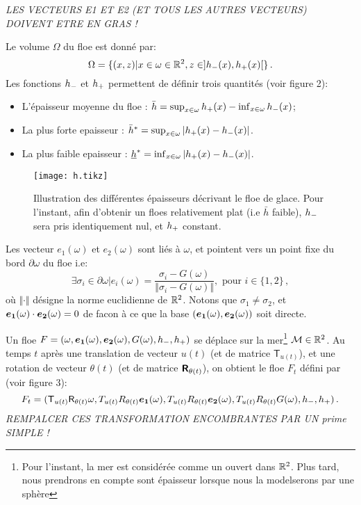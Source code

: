 \emph{LES VECTEURS E1 ET E2 (ET TOUS LES AUTRES VECTEURS) DOIVENT ETRE EN GRAS !}

Le volume $\Omega$ du floe est donné par:
\[
    \Omega = \{(x,z) | x \in \omega \in \mathbb{R}^2, z \in ]h_{-}(x), h_{+}(x)[ \} \,.
\] 
Les fonctions $h_{-}$ et $h_{+}$ permettent de définir trois quantités (voir figure 2):
\begin{itemize}
    \item L'épaisseur moyenne du floe : $\bar{h} =  \sup_{x\in\omega}{h_{+}(x)} - \inf_{x\in\omega}{h_{-}(x)}$;
    \item La plus forte epaisseur : $\bar{h}^* = \sup_{x\in\omega}{ \vert h_{+}(x) - h_{-}(x) \vert}$. 
    \item La plus faible epaisseur : $\underline{h}^* = \inf_{x\in\omega}{ \vert h_{+}(x) - h_{-}(x) \vert} $. 
\end{itemize}

\begin{figure}
    \centering
    \texttt{[image: h.tikz]}
    \caption{Illustration des différentes épaisseurs décrivant le floe de glace. Pour l'instant, afin d'obtenir un floes relativement plat (i.e $\bar{h}$ faible), $h_{-}$ sera pris identiquement nul, et $h_{+}$ constant.}
\end{figure}

Les vecteur $e_1(\omega)$ et $e_2(\omega)$ sont liés à $\omega$, et pointent vers un point fixe du bord $\partial \omega$ du floe i.e:
\[
    \exists \sigma_i \in \partial \omega | e_i(\omega) = \frac{\sigma_i - G(\omega)}{\Vert \sigma_i - G(\omega) \Vert}, \text{ pour } i \in \{1,2\} \,,
\]
où $\Vert \cdot \Vert$ désigne la norme euclidienne de $\mathbb{R}^2$. Notons que $\sigma_1 \neq \sigma_2$, et $\bm{e_1}(\omega) \cdot \bm{e_2}(\omega) = 0$ de facon à ce que la base $(\bm{e_1}(\omega), \bm{e_2}(\omega))$ soit directe.

Un floe $F = (\omega, \bm{e_1}(\omega), \bm{e_2}(\omega), G(\omega), h_{-}, h_{+})$ se déplace sur la mer\footnote{Pour l'instant, la mer est considérée comme un ouvert dans $\mathbb{R}^2$. Plus tard, nous prendrons en compte sont épaisseur lorsque nous la modelserons par une sphère} $\mathcal{M} \in \mathbb{R}^2$. Au temps $t$ après une translation de vecteur $u(t)$ (et de matrice $\mathsf{T}_{u(t)}$), et une rotation de vecteur $\theta(t)$ (et de matrice $\bm{\mathsf{R}}_{\theta(t)}$), on obtient le floe $F_t$ défini par (voir figure 3):
\[
    F_t = (\mathsf{T}_{u(t)}\mathsf{R}_{\theta(t)}\omega, T_{u(t)}R_{\theta(t)}\bm{e_1}(\omega), T_{u(t)}R_{\theta(t)}\bm{e_2}(\omega), T_{u(t)}R_{\theta(t)}G(\omega), h_{-}, h_{+}) \,.
\]
\emph{REMPALCER CES TRANSFORMATION ENCOMBRANTES PAR UN prime SIMPLE !}

